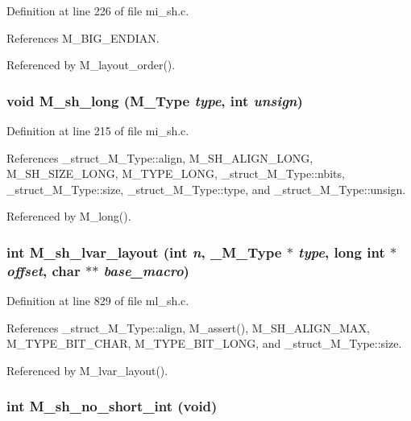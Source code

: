 Definition at line 226 of file mi\_\-sh.c.

References M\_\-BIG\_\-ENDIAN.

Referenced by M\_\-layout\_\-order().
\subsubsection{\setlength{\rightskip}{0pt plus 5cm}void M\_\-sh\_\-long (\bf{M\_\-Type} {\em type}, int {\em unsign})}\label{m__sh_8h_b719980e8ecc9ae306f11206b9fcca4c}




Definition at line 215 of file mi\_\-sh.c.

References \_\-struct\_\-M\_\-Type::align, M\_\-SH\_\-ALIGN\_\-LONG, M\_\-SH\_\-SIZE\_\-LONG, M\_\-TYPE\_\-LONG, \_\-struct\_\-M\_\-Type::nbits, \_\-struct\_\-M\_\-Type::size, \_\-struct\_\-M\_\-Type::type, and \_\-struct\_\-M\_\-Type::unsign.

Referenced by M\_\-long().
\subsubsection{\setlength{\rightskip}{0pt plus 5cm}int M\_\-sh\_\-lvar\_\-layout (int {\em n}, \bf{\_\-M\_\-Type} $\ast$ {\em type}, long int $\ast$ {\em offset}, char $\ast$$\ast$ {\em base\_\-macro})}\label{m__sh_8h_79ec1e4dda5ba4cbe92f9990b61a6e19}




Definition at line 829 of file ml\_\-sh.c.

References \_\-struct\_\-M\_\-Type::align, M\_\-assert(), M\_\-SH\_\-ALIGN\_\-MAX, M\_\-TYPE\_\-BIT\_\-CHAR, M\_\-TYPE\_\-BIT\_\-LONG, and \_\-struct\_\-M\_\-Type::size.

Referenced by M\_\-lvar\_\-layout().
\subsubsection{\setlength{\rightskip}{0pt plus 5cm}int M\_\-sh\_\-no\_\-short\_\-int (void)}\label{m__sh_8h_f811ced2c8723497d2a089fd4bf24e0d}




